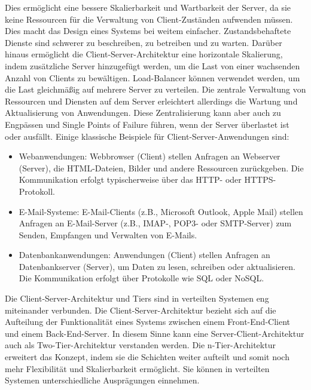 \documentclass[../vs-script-first-v01.tex]{subfiles}
\begin{document}
Dies ermöglicht eine bessere Skalierbarkeit und Wartbarkeit der Server, da sie keine Ressourcen für die Verwaltung von Client-Zuständen aufwenden müssen. Dies macht das Design eines Systems bei weitem einfacher. Zustandsbehaftete Dienste sind schwerer zu beschreiben, zu betreiben und zu warten. 
Darüber hinaus ermöglicht die Client-Server-Architektur eine horizontale Skalierung, indem zusätzliche Server hinzugefügt werden, um die Last von einer wachsenden Anzahl von Clients zu bewältigen. Load-Balancer können verwendet werden, um die Last gleichmäßig auf mehrere Server zu verteilen.
Die zentrale Verwaltung von Ressourcen und Diensten auf dem Server erleichtert allerdings die Wartung und Aktualisierung von Anwendungen. Diese Zentralisierung kann aber auch zu Engpässen und Single Points of Failure führen, wenn der Server überlastet ist oder ausfällt. Einige klassische Beispiele für Client-Server-Anwendungen sind:
\begin{itemize}
\item Webanwendungen: Webbrowser (Client) stellen Anfragen an Webserver (Server), die HTML-Dateien, Bilder und andere Ressourcen zurückgeben. Die Kommunikation erfolgt typischerweise über das HTTP- oder HTTPS-Protokoll.
\item E-Mail-Systeme: E-Mail-Clients (z.B., Microsoft Outlook, Apple Mail) stellen Anfragen an E-Mail-Server (z.B., IMAP-, POP3- oder SMTP-Server) zum Senden, Empfangen und Verwalten von E-Mails.
\item Datenbankanwendungen: Anwendungen (Client) stellen Anfragen an Datenbankserver (Server), um Daten zu lesen, schreiben oder aktualisieren. Die Kommunikation erfolgt über Protokolle wie SQL oder NoSQL.
\end{itemize}
Die Client-Server-Architektur und Tiers sind in verteilten Systemen eng miteinander verbunden. Die Client-Server-Architektur bezieht sich auf die Aufteilung der Funktionalität eines Systems zwischen einem Front-End-Client und einem Back-End-Server. In diesem Sinne kann eine Server-Client-Architektur auch als Two-Tier-Architektur verstanden werden. Die n-Tier-Architektur erweitert das Konzept, indem sie die Schichten weiter aufteilt und somit noch mehr Flexibilität und Skalierbarkeit ermöglicht. Sie können in verteilten Systemen unterschiedliche Ausprägungen einnehmen.
\end{document}
